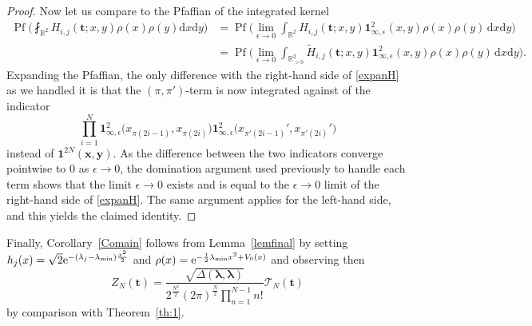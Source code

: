 \documentclass[10pt,a4paper]{amsart}
\numberwithin{equation}{section}
\newcommand{\dd}{\mathrm{d}}
\begin{document}
\begin{proof}
Now let us compare to the Pfaffian of the integrated kernel
\begin{align*}
\operatorname{Pf} \biggl( \fint_{\mathbb{R}^2} H_{i,j}(\mathbf{t};x,y) \rho(x)\rho(y) \dd x \dd y\biggr) & = \operatorname{Pf} \biggl(\lim_{\epsilon \rightarrow 0} \int_{\mathbb{R}^2}H_{i,j}(\mathbf{t};x,y) \mathbf{1}_{\infty,\epsilon}^{2}(x,y) \rho(x) \rho(y)\, \dd x \dd y \biggr) \\
& = \operatorname{Pf} \biggl(\lim_{\epsilon \rightarrow 0} \int_{\mathbb{R}_{> 0}^2} \tilde{H}_{i,j}(\mathbf{t};x,y) \mathbf{1}_{\infty,\epsilon} ^2(x,y)\rho(x)\rho(y)\, \dd x \dd y\biggr).
\end{align*}
Expanding the Pfaffian, the only difference with the right-hand side of \eqref{expanH} as we handled it is that the $(\pi,\pi')$-term is now integrated against of the indicator
\[
\prod_{i = 1}^{N} \mathbf{1}^2_{\infty,\epsilon}\bigl(x_{\pi(2i - 1)},x_{\pi(2i)}\bigr) \mathbf{1}^2_{\infty,\epsilon}\bigl(x_{\pi'(2i-1)}',x_{\pi'(2i)}'\bigr)
\]
instead of $\mathbf{1}^{2N}(\boldsymbol{x},\boldsymbol{y})$. As the difference between the two indicators converge pointwise to $0$ as $\epsilon \rightarrow 0$, the domination argument used previously to handle each term shows that the limit $\epsilon \rightarrow 0$ exists and is equal to the $\epsilon \rightarrow 0$ limit of the right-hand side of \eqref{expanH}. The same argument applies for the left-hand side, and this yields the claimed identity.
\end{proof}


Finally, Corollary~\ref{Comain} follows from Lemma~\ref{lemfinal}
by setting
$h_j(x) = \sqrt{2} {\rm e}^{-(\lambda_j-\lambda_{\min})\frac{x^2}{2}}$ and
$\rho(x) = {\rm e}^{-\frac{1}{2}\lambda_{\min} x^2 + V_0(x)}$
and observing then
\[
Z_N(\mathbf{t}) = \frac{\sqrt{\Delta(\boldsymbol{\lambda},\boldsymbol{\lambda})}}{2^{\frac{N^2}{2}} (2\pi)^{\frac{N}{2}} \prod_{n = 1}^{N - 1} n!} \mathcal{T}_N(\mathbf{t})
\]
 by comparison with Theorem~\ref{th:1}.
\end{document}
